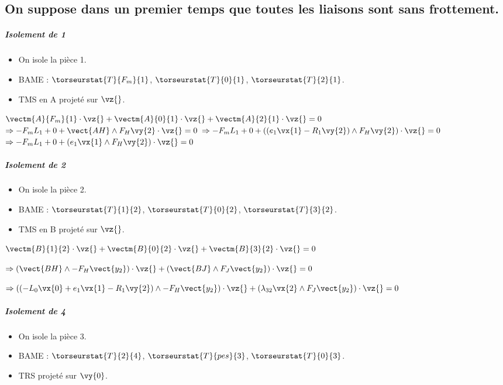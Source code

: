 \subsection*{On suppose dans un premier temps que toutes les liaisons sont sans frottement.}

\ifprof
\begin{corrige}
\subparagraph*{Isolement de 1}

\begin{itemize}
\item On isole la pièce 1.
\item BAME : $\torseurstat{T}{F_m}{1}$, $\torseurstat{T}{0}{1}$, $\torseurstat{T}{2}{1}$.
\item TMS en A projeté sur $\vz{}$.
\end{itemize}
$\vectm{A}{F_m}{1}\cdot \vz{}+\vectm{A}{0}{1}\cdot \vz{}+\vectm{A}{2}{1}\cdot \vz{} = 0$
$\Rightarrow -F_mL_1+0+\vect{AH}\wedge  F_H \vy{2}\cdot \vz{} = 0$
$\Rightarrow -F_mL_1+0+\left(\left(e_1\vx{1} -R_1\vy{2}\right)\wedge  F_H \vy{2} \right)\cdot \vz{} = 0$
$\Rightarrow -F_mL_1+0+\left(e_1\vx{1}\wedge  F_H \vy{2} \right)\cdot \vz{} = 0$



\subparagraph*{Isolement de 2}
\begin{itemize}
\item On isole la pièce 2.
\item BAME : $\torseurstat{T}{1}{2}$, $\torseurstat{T}{0}{2}$, $\torseurstat{T}{3}{2}$.
\item TMS en B projeté sur $\vz{}$.
\end{itemize}
$\vectm{B}{1}{2}\cdot \vz{}+\vectm{B}{0}{2}\cdot \vz{}+\vectm{B}{3}{2}\cdot \vz{} = 0$

$\Rightarrow \left(\vect{BH}\wedge -F_H \vect{y_2} \right)\cdot\vz{}+\left(\vect{BJ}\wedge F_J \vect{y_2} \right)\cdot\vz{} = 0$

$\Rightarrow \left(\left( -L_0\vx{0} +e_1 \vx{1} -R_1 \vy{2}\right)\wedge -F_H \vect{y_2} \right)\cdot\vz{}+\left(\lambda_{32} \vx{2} \wedge F_J \vect{y_2} \right)\cdot\vz{} = 0$



\subparagraph*{Isolement de 4}
\begin{itemize}
\item On isole la pièce 3.
\item BAME : $\torseurstat{T}{2}{4}$, $\torseurstat{T}{pes}{3}$, $\torseurstat{T}{0}{3}$.
\item TRS projeté sur $\vy{0}$.
\end{itemize}


\end{corrige}
